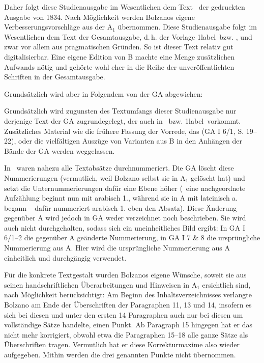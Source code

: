 Daher folgt diese Studienausgabe im Wesentlichen dem Text \Alabel\ der gedruckten Ausgabe von 1834. Nach Möglichkeit werden Bolzanos eigene Verbesserungsvorschläge aus der A$_1$ übernommen. 
Diese Studienausgabe folgt im Wesentlichen dem Text der Gesamtausgabe, d.\,h. der Vorlage \A1label\ bzw. \Alabel , und zwar vor allem aus pragmatischen Gründen. So ist dieser Text relativ gut digitalisierbar. Eine eigene Edition von B machte eine Menge zusätzlichen Aufwands nötig und gehörte wohl eher in die Reihe der unveröffentlichten Schriften in der 
Gesamtausgabe.\par
Grundsätzlich wird aber in Folgendem von der GA abgewichen:
\begin{aufza}
\item Grundsätzlich wird zugunsten des Textumfangs dieser Studienausgabe nur derjenige Text der GA zugrundegelegt, der auch in \Alabel\ bzw. \A1label\ vorkommt. Zusätzliches Material wie die frühere Fassung der Vorrede, das  (GA I 6/1, S. 19--22), oder die vielfältigen Auszüge von Varianten aus B in den Anhängen der Bände der GA werden weggelassen.
\item In \Alabel\ waren nahezu alle Textabsätze durchnummeriert. Die GA löscht diese Nummerierungen (vermutlich, weil Bolzano selbst sie in A$_1$ gelöscht hat) und setzt die Unternummerierungen dafür eine Ebene höher (\dh\ eine nachgeordnete Aufzählung beginnt nun mit arabisch 1., während sie in A mit lateinisch a. begann -- dafür nummeriert arabisch 1. eben den Absatz). Diese Änderung gegenüber A wird jedoch in GA weder verzeichnet noch beschrieben. Sie wird auch nicht durchgehalten, sodass sich ein uneinheitliches Bild ergibt: In GA I 6/1--2 die gegenüber A geänderte Nummerierung, in GA I 7 \& 8 die ursprüngliche Nummerierung aus A. Hier wird die ursprüngliche Nummerierung aus A einheitlich und durchgängig verwendet.
\end{aufza}
Für die konkrete Textgestalt wurden Bolzanos eigene Wünsche, soweit sie aus seinen handschriftlichen Überarbeitungen und Hinweisen in A$_1$ ersichtlich sind, nach Möglichkeit berücksichtigt: 
Am Beginn des Inhaltsverzeichnisses verlangte Bolzano am Ende der Überschriften der Paragraphen 11, 13 und 14, insofern es sich bei diesen und unter den ersten 14 Paragraphen auch nur bei diesen um vollständige Sätze handelte, einen Punkt. Ab Paragraph 15 hingegen hat er das nicht mehr korrigiert, obwohl etwa die Paragraphen 15--18 alle ganze Sätze als Überschriften tragen. Vermutlich hat er diese Korrekturmaxime also wieder aufgegeben. Mithin werden die drei genannten Punkte nicht übernommen.\par
